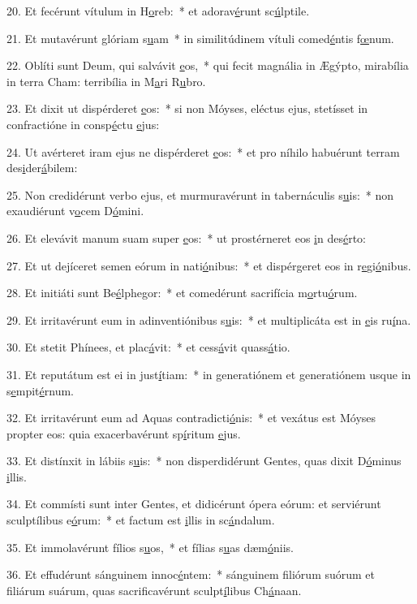 20. Et fecérunt vítulum in H\uline{o}reb:~* et adorav\uline{é}runt sc\uline{ú}lptile.\par 
21. Et mutavérunt glóriam s\uline{u}am~* in similitúdinem vítuli comed\uline{é}ntis f\uline{œ}num.\par 
22. Oblíti sunt Deum, qui salvávit \uline{e}os,~* qui fecit magnália in Ægýpto, mirabília in terra Cham: terribília in M\uline{a}ri R\uline{u}bro.\par 
23. Et dixit ut dispérderet \uline{e}os:~* si non Móyses, eléctus ejus, stetísset in confractióne in consp\uline{é}ctu \uline{e}jus:\par 
24. Ut avérteret iram ejus ne dispérderet \uline{e}os:~* et pro níhilo habuérunt terram des\uline{i}der\uline{á}bilem:\par 
25. Non credidérunt verbo ejus, et murmuravérunt in tabernáculis s\uline{u}is:~* non exaudiérunt v\uline{o}cem D\uline{ó}mini.\par 
26. Et elevávit manum suam super \uline{e}os:~* ut prostérneret eos \uline{i}n des\uline{é}rto:\par 
27. Et ut dejíceret semen eórum in nati\uline{ó}nibus:~* et dispérgeret eos in r\uline{e}gi\uline{ó}nibus.\par 
28. Et initiáti sunt Be\uline{é}lphegor:~* et comedérunt sacrifícia m\uline{o}rtu\uline{ó}rum.\par 
29. Et irritavérunt eum in adinventiónibus s\uline{u}is:~* et multiplicáta est in \uline{e}is ru\uline{í}na.\par 
30. Et stetit Phínees, et plac\uline{á}vit:~* et cess\uline{á}vit quass\uline{á}tio.\par 
31. Et reputátum est ei in just\uline{í}tiam:~* in generatiónem et generatiónem usque in s\uline{e}mpit\uline{é}rnum.\par 
32. Et irritavérunt eum ad Aquas contradicti\uline{ó}nis:~* et vexátus est Móyses propter eos: quia exacerbavérunt sp\uline{í}ritum \uline{e}jus.\par 
33. Et distínxit in lábiis s\uline{u}is:~* non disperdidérunt Gentes, quas dixit D\uline{ó}minus \uline{i}llis.\par 
34. Et commísti sunt inter Gentes, et didicérunt ópera eórum: et serviérunt sculptílibus e\uline{ó}rum:~* et factum est \uline{i}llis in sc\uline{á}ndalum.\par 
35. Et immolavérunt fílios s\uline{u}os,~* et fílias s\uline{u}as dæm\uline{ó}niis.\par 
36. Et effudérunt sánguinem innoc\uline{é}ntem:~* sánguinem filiórum suórum et filiárum suárum, quas sacrificavérunt sculpt\uline{í}libus Ch\uline{á}naan.\par 
